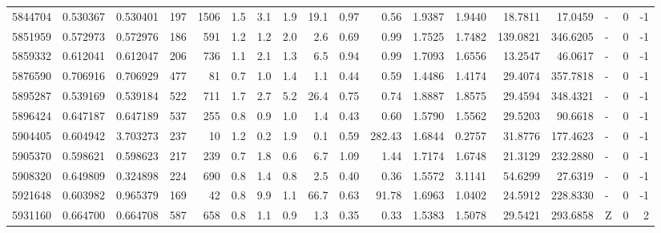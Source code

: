 \begin{tabular}{rrrrrrrrrrrrrrrlrr}
   5844704 & 0.530367 &   0.530401 &  197 & 1506 &      1.5 &      3.1 &     1.9 &     19.1 &       0.97 &        0.56 &  1.9387 &  1.9440 &   18.7811 &   17.0459 &             - &        0 &         -1 \\
   5851959 & 0.572973 &   0.572976 &  186 &  591 &      1.2 &      1.2 &     2.0 &      2.6 &       0.69 &        0.99 &  1.7525 &  1.7482 &  139.0821 &  346.6205 &             - &        0 &         -1 \\
   5859332 & 0.612041 &   0.612047 &  206 &  736 &      1.1 &      2.1 &     1.3 &      6.5 &       0.94 &        0.99 &  1.7093 &  1.6556 &   13.2547 &   46.0617 &             - &        0 &         -1 \\
   5876590 & 0.706916 &   0.706929 &  477 &   81 &      0.7 &      1.0 &     1.4 &      1.1 &       0.44 &        0.59 &  1.4486 &  1.4174 &   29.4074 &  357.7818 &             - &        0 &         -1 \\
   5895287 & 0.539169 &   0.539184 &  522 &  711 &      1.7 &      2.7 &     5.2 &     26.4 &       0.75 &        0.74 &  1.8887 &  1.8575 &   29.4594 &  348.4321 &             - &        0 &         -1 \\
   5896424 & 0.647187 &   0.647189 &  537 &  255 &      0.8 &      0.9 &     1.0 &      1.4 &       0.43 &        0.60 &  1.5790 &  1.5562 &   29.5203 &   90.6618 &             - &        0 &         -1 \\
   5904405 & 0.604942 &   3.703273 &  237 &   10 &      1.2 &      0.2 &     1.9 &      0.1 &       0.59 &      282.43 &  1.6844 &  0.2757 &   31.8776 &  177.4623 &             - &        0 &         -1 \\
   5905370 & 0.598621 &   0.598623 &  217 &  239 &      0.7 &      1.8 &     0.6 &      6.7 &       1.09 &        1.44 &  1.7174 &  1.6748 &   21.3129 &  232.2880 &             - &        0 &         -1 \\
   5908320 & 0.649809 &   0.324898 &  224 &  690 &      0.8 &      1.4 &     0.8 &      2.5 &       0.40 &        0.36 &  1.5572 &  3.1141 &   54.6299 &   27.6319 &             - &        0 &         -1 \\
   5921648 & 0.603982 &   0.965379 &  169 &   42 &      0.8 &      9.9 &     1.1 &     66.7 &       0.63 &       91.78 &  1.6963 &  1.0402 &   24.5912 &  228.8330 &             - &        0 &         -1 \\
   5931160 & 0.664700 &   0.664708 &  587 &  658 &      0.8 &      1.1 &     0.9 &      1.3 &       0.35 &        0.33 &  1.5383 &  1.5078 &   29.5421 &  293.6858 &             Z &        0 &          2 \\

\end{tabular}
